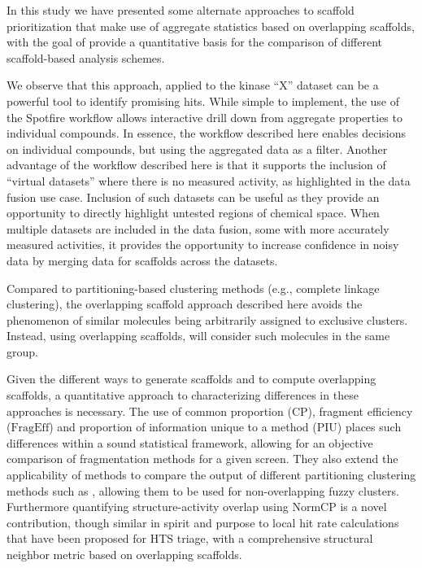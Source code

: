 \documentclass[journal=jacsat,manuscript=article]{achemso}
\begin{document}
In this study we have presented some alternate approaches to scaffold
prioritization that make use of aggregate statistics based on
overlapping scaffolds, with the goal of provide a quantitative basis
for the comparison of different scaffold-based analysis schemes. 

We observe that this approach, applied to the kinase ``X'' dataset can
be a powerful tool to identify promising hits. While simple to implement,
the use of the Spotfire workflow allows interactive drill
down from aggregate properties to individual compounds. In essence,
the workflow described here enables decisions on individual compounds,
but using the aggregated data as a filter. Another advantage of the
workflow described here is that it supports the inclusion of ``virtual
datasets'' where there is no measured activity, as highlighted in the
data fusion use case.  Inclusion of such datasets can be useful as
they provide an opportunity to directly highlight untested regions of
chemical space. When multiple datasets are included in the data fusion, 
some with more accurately measured activities, it provides the opportunity to increase
confidence in noisy data by merging data for scaffolds across the
datasets.

Compared to partitioning-based clustering methods (e.g., complete
linkage clustering), the overlapping scaffold approach described here
avoids the phenomenon of similar molecules being arbitrarily assigned to
exclusive clusters.  Instead, using overlapping scaffolds, will
consider such molecules in the same group.

Given the different ways to generate scaffolds and to compute
overlapping scaffolds, a quantitative approach to characterizing
differences in these approaches is necessary. The use of common
proportion ($\textrm{CP}$), fragment efficiency ($\textrm{FragEff}$)
and proportion of information unique to a method ($\textrm{PIU}$) 
places such differences within a sound statistical framework, allowing
for an objective comparison of fragmentation methods for a given
screen. They also extend the applicability of
methods to compare the output of different partitioning clustering
methods such as \citeauthor{Torres2009}, allowing them to be used for
non-overlapping fuzzy clusters. Furthermore quantifying
structure-activity overlap using $\textrm{NormCP}$ is a novel
contribution, though similar in spirit and purpose to local hit rate
calculations that have been proposed for HTS triage\cite{Posner2009},
with a comprehensive structural neighbor metric based on overlapping
scaffolds.
\end{document}
